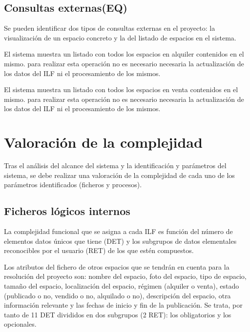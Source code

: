 \subsection{Consultas externas(EQ)}
\par Se pueden identificar dos tipos de consultas externas en el proyecto: la visualización de un espacio concreto y la del listado de espacios en el sistema.
\begin{description}[style=multiline, leftmargin=3cm]
    \item[Ver el listado de espacios en alquiler] El sistema muestra un listado con todos los espacios en alquiler contenidos en el mismo. para realizar esta operación no es necesario necesaria la actualización de los datos del ILF ni el procesamiento de los mismos.
    \item[Ver el listado de espacios en venta] El sistema muestra un listado con todos los espacios en venta contenidos en el mismo. para realizar esta operación no es necesario necesaria la actualización de los datos del ILF ni el procesamiento de los mismos.
\end{description}


\section{Valoración de la complejidad}
\par Tras el análisis del alcance del sistema y la identificación y parámetros del sistema, se debe realizar una valoración de la complejidad de cada uno de los parámetros identificados (ficheros y procesos).

\subsection{Ficheros lógicos internos}
\par La complejidad funcional que se asigna a cada ILF es función del número de elementos datos únicos que tiene (DET) y los subgrupos de datos elementales reconocibles por el usuario (RET) de los que estén compuestos.

\par Los atributos del fichero de otros espacios que se tendrán en cuenta para la resolución del proyecto son: nombre del espacio, foto del espacio, tipo de espacio, tamaño del espacio, localización del espacio, régimen (alquiler o venta), estado (publicado o no, vendido o no, alquilado o no), descripción del espacio, otra información relevante y las fechas de inicio y fin de la publicación. Se trata, por tanto de 11 DET divididos en dos subgrupos (2 RET): los obligatorios y los opcionales.

